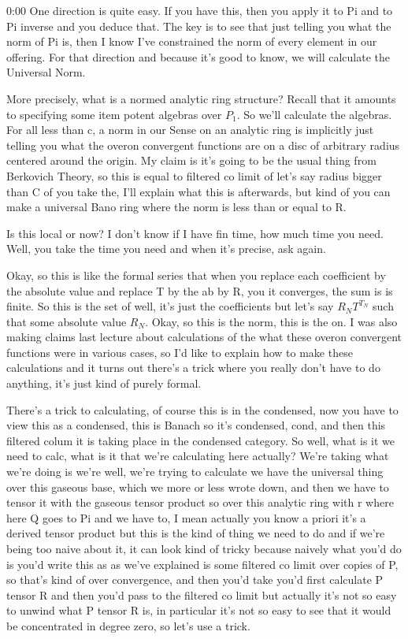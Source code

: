 \begin{unfinished}{0:00}
One direction is quite easy. If you have this, then you apply it to Pi and to Pi inverse and you deduce that. The key is to see that just telling you what the norm of Pi is, then I know I've constrained the norm of every element in our offering. For that direction and because it's good to know, we will calculate the Universal Norm.

More precisely, what is a normed analytic ring structure? Recall that it amounts to specifying some item potent algebras over $P_1$. So we'll calculate the algebras. For all less than c, a norm in our Sense on an analytic ring is implicitly just telling you what the overon convergent functions are on a disc of arbitrary radius centered around the origin. My claim is it's going to be the usual thing from Berkovich Theory, so this is equal to filtered co limit of let's say radius bigger than C of you take the, I'll explain what this is afterwards, but kind of you can make a universal Bano ring where the norm is less than or equal to R.

Is this local or now? I don't know if I have fin time, how much time you need. Well, you take the time you need and when it's precise, ask again.

Okay, so this is like the formal series that when you replace each coefficient by the absolute value and replace T by the ab by R, you it converges, the sum is is finite. So this is the set of well, it's just the coefficients but let's say $R_N T^{T_N}$ such that some absolute value $R_N$. Okay, so this is the norm, this is the on. I was also making claims last lecture about calculations of the what these overon convergent functions were in various cases, so I'd like to explain how to make these calculations and it turns out there's a trick where you really don't have to do anything, it's just kind of purely formal.

There's a trick to calculating, of course this is in the condensed, now you have to view this as a condensed, this is Banach so it's condensed, cond, and then this filtered colum it is taking place in the condensed category. So well, what is it we need to calc, what is it that we're calculating here actually? We're taking what we're doing is we're well, we're trying to calculate we have the universal thing over this gaseous base, which we more or less wrote down, and then we have to tensor it with the gaseous tensor product so over this analytic ring with r where here Q goes to Pi and we have to, I mean actually you know a priori it's a derived tensor product but this is the kind of thing we need to do and if we're being too naive about it, it can look kind of tricky because naively what you'd do is you'd write this as as we've explained is some filtered co limit over copies of P, so that's kind of over convergence, and then you'd take you'd first calculate P tensor R and then you'd pass to the filtered co limit but actually it's not so easy to unwind what P tensor R is, in particular it's not so easy to see that it would be concentrated in degree zero, so let's use a trick.


\end{unfinished}
